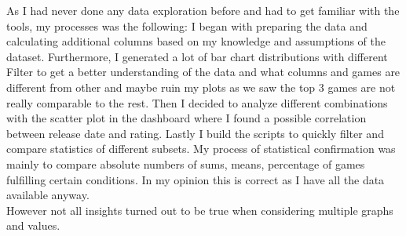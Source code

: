 \documentclass[11pt]{article}
\begin{document}
As I had never done any data exploration before and had to get familiar with the tools, my processes was the following: I began with preparing the data and calculating additional columns based on my knowledge and assumptions of the dataset. Furthermore, I generated a lot of bar chart distributions with different Filter to get a better understanding of the data and what columns and games are different from other and maybe ruin my plots as we saw the top 3 games are not really comparable to the rest.
Then I decided to analyze different combinations with the scatter plot in the dashboard where I found a possible correlation between release date and rating. Lastly I build the scripts to quickly filter and compare statistics of different subsets. My process of statistical confirmation was mainly to compare absolute numbers of sums, means, percentage of games fulfilling certain conditions. In my opinion this is correct as I have all the data available anyway.\\
However not all insights turned out to be true when considering multiple graphs and values. 
\end{document}
